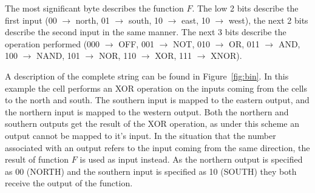 The most significant byte describes the function $F$. The low 2 bits describe
the first input (00 $\rightarrow$ north, 01 $\rightarrow$ south, 10
$\rightarrow$ east, 10 $\rightarrow$ west), the next 2 bits describe the second
input in the same manner. The next 3 bits describe the operation performed
(000 $\rightarrow$ OFF, 001 $\rightarrow$ NOT, 010 $\rightarrow$ OR, 011 $\rightarrow$
AND, 100 $\rightarrow$ NAND, 101 $\rightarrow$ NOR, 110 $\rightarrow$ XOR, 111
$\rightarrow$ XNOR).

A description of
the complete string can be found in Figure~\ref{fig:bin}. In this example
the cell performs an XOR operation on the inputs coming from the cells to
the north and south. The southern input is mapped to the eastern output,
and the northern input is mapped to the western output. Both the northern
and southern outputs get the result of the XOR operation, as under this
scheme
an output cannot be mapped to it's input. In the situation that the
number associated with an output refers to the input coming from the same
direction, the result of function $F$ is used as input instead. As the northern output
is specified as 00 (NORTH) and the southern input is specified as 10 (SOUTH)
they both receive the output of the function.

